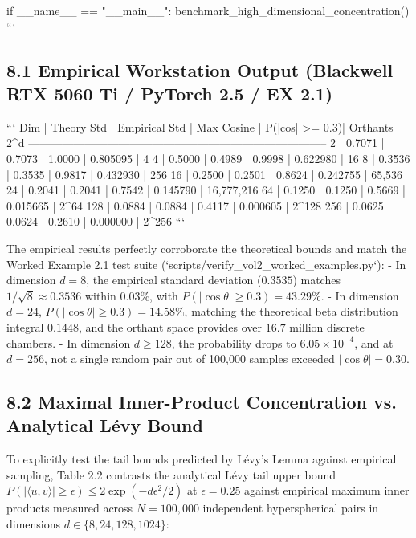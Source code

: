 \documentclass[11pt,twoside,openright]{amsbook}
\begin{document}
if __name__ == "__main__":
    benchmark_high_dimensional_concentration()
```

\subsection{8.1 Empirical Workstation Output (Blackwell RTX 5060 Ti / PyTorch 2.5 / EX 2.1)}

```
  Dim | Theory Std | Empirical Std | Max Cosine | P(|cos| >= 0.3)|    Orthants 2^d
--------------------------------------------------------------------------------
    2 |     0.7071 |        0.7073 |     1.0000 |       0.805095 |               4
    4 |     0.5000 |        0.4989 |     0.9998 |       0.622980 |              16
    8 |     0.3536 |        0.3535 |     0.9817 |       0.432930 |             256
   16 |     0.2500 |        0.2501 |     0.8624 |       0.242755 |          65,536
   24 |     0.2041 |        0.2041 |     0.7542 |       0.145790 |      16,777,216
   64 |     0.1250 |        0.1250 |     0.5669 |       0.015665 |            2^64
  128 |     0.0884 |        0.0884 |     0.4117 |       0.000605 |           2^128
  256 |     0.0625 |        0.0624 |     0.2610 |       0.000000 |           2^256
```

The empirical results perfectly corroborate the theoretical bounds and match the Worked Example 2.1 test suite (`scripts/verify_vol2_worked_examples.py`):
- In dimension $d = 8$, the empirical standard deviation ($0.3535$) matches $1/\sqrt{8} \approx 0.3536$ within $0.03\%$, with $P(|\cos\theta| \ge 0.3) = 43.29\%$.
- In dimension $d = 24$, $P(|\cos\theta| \ge 0.3) = 14.58\%$, matching the theoretical beta distribution integral $0.1448$, and the orthant space provides over $16.7$ million discrete chambers.
- In dimension $d \ge 128$, the probability drops to $6.05 \times 10^{-4}$, and at $d = 256$, not a single random pair out of 100,000 samples exceeded $|\cos\theta| = 0.30$.

\subsection{8.2 Maximal Inner-Product Concentration vs. Analytical Lévy Bound}

To explicitly test the tail bounds predicted by Lévy's Lemma against empirical sampling, Table 2.2 contrasts the analytical Lévy tail upper bound $P(|\langle u, v \rangle| \ge \epsilon) \le 2\exp(-d \epsilon^2 / 2)$ at $\epsilon = 0.25$ against empirical maximum inner products measured across $N = 100,000$ independent hyperspherical pairs in dimensions $d \in \{8, 24, 128, 1024\}$:
\end{document}
